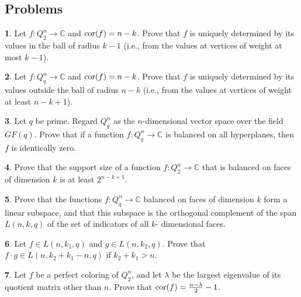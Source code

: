 \documentclass[11pt]{article}
\theoremstyle{definition}
\newtheorem{exercise}{\quad}
\newcommand{\cor}{{\rm cor}}
\begin{document}
{{{\subsection{Problems}


\begin{exercise}
Let $f:Q_2^n\rightarrow \mathbb{C}$ and $\cor(f)=n-k$. Prove
that $f$ is uniquely determined by its values in the ball
of radius $k-1$ (i.e., from the values at vertices of weight at most $k-1$).
\end{exercise}

\begin{exercise}
Let $f:Q_q^n\rightarrow \mathbb{C}$ and $\cor(f)=n-k$. Prove
that $f$ is uniquely determined by its values outside the ball
of radius $n-k$ (i.e., from the values at vertices of weight at least
$n-k+1$).
\end{exercise}

\begin{exercise}
Let $q$ be prime. Regard $Q^n_q$ as the $n$-dimensional vector
space over the field $GF(q)$. Prove that if a function
$f:Q^n_q\rightarrow \mathbb{C}$ is balanced on all hyperplanes,
then $f$ is identically zero.
\end{exercise}

\begin{exercise}
Prove that the support size of a function $f:Q_2^n\rightarrow
\mathbb{C}$ that is balanced on faces of dimension $k$ is at least
$2^{n-k+1}$.
\end{exercise}

\begin{exercise}
Prove that the functions $f:Q_q^n\rightarrow \mathbb{C}$
balanced on faces of dimension $k$ form a linear
subspace, and that this subspace is the orthogonal
complement of the  span $L(n,k,q)$ of the set of indicators
of all  $k$- dimensional faces.
\end{exercise}

\begin{exercise}
Let $f\in L(n,k_1,q)$ and $g\in L(n,k_2,q)$. Prove that\\ $f\cdot g\in
L(n,k_2+k_1-n,q)$ if $k_2+k_1>n$.
\end{exercise}

\begin{exercise}
Let $f$ be a perfect coloring of $Q_2^n$, and let $\lambda$ be the largest eigenvalue of its quotient matrix other than  $n$. Prove that
$\cor(f)=\frac{n-\lambda}{2}-1$.
\end{exercise}

}}}
\end{document}
